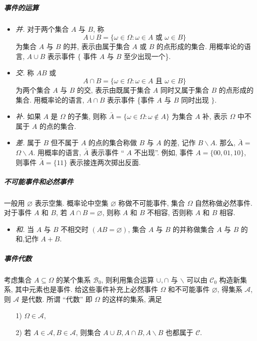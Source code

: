\subparagraph{事件的运算}
\begin{itemize}
    \item \emph {并.} 对于两个集合 $A$ 与 $B$, 称
    $$
    A \cup B=\{\omega \in \Omega: \omega \in A \text { 或 } \omega \in B\}
    $$
    为集合 $A$ 与 $B$ 的并, 表示由属于集合 $A$ 或 $B$ 的点形成的集合. 用概率论的语言, $A \cup B$ 表示事件 $\{$ 事件 $A$ 与 $B$ 至少出现一个\}.
    \item \emph {交.} 称 $A B$ 或
    $$
    A \cap B=\{\omega \in \Omega: \omega \in A \text { 且 } \omega \in B\}
    $$
    为两个集合 $A$ 与 $B$ 的交, 表示由既属于集合 $A$ 同时又属于集合 $B$ 的点形成的集合. 用概率论的语言, $A \cap B$ 表示事件 \{事件 $A$ 与 $B$ 同时出现 $\}$.
    \item \emph{补.} 如果 $A$ 是 $\Omega$ 的子集, 则称 $\bar{A}=\{\omega \in \Omega: \omega \notin A\}$ 为集合 $A$ 补, 表示 $\Omega$ 中不属于 $A$ 的点的集合.
    \item \emph{差.} 属于 $B$ 但不属于 $A$ 的点的集合称做 $B$ 与 $A$ 的差, 记作 $B \backslash A$. 那么, $\bar{A}=$ $\Omega \backslash A$. 用概率的语言, $\bar{A}$ 表示事件 `` $A$ 不出现''. 例如, 事件 $A=\{00,01,10\}$, 则事件 $\bar{A}=\{11\}$ 表示接连两次掷出反面.
\end{itemize}

\subparagraph{不可能事件和必然事件} 一般用 $\varnothing$ 表示空集. 概率论中空集 $\varnothing$ 称做不可能事件, 集合 $\Omega$ 自然称做必然事件. 
对于事件 $A$ 和 $B$, 若 $A \cap B=\varnothing$, 则称 $A$ 和 $B$ 不相容, 否则称 $A$ 和 $B$ 相容. 
\begin{itemize}
    \item \emph{和. } 当 $A$ 与 $B$ 不相交时 $(A B=\varnothing)$, 集合 $A$ 与 $B$ 的并称做集合 $A$ 与 $B$ 的和,记作 $A+B$.
\end{itemize}

\subparagraph{事件代数} 考虑集合 $A \subseteq \Omega$ 的某个集系 $\mathscr{B}_0$, 则利用集合运算 $\cup, \cap$ 与 $\backslash$ 可以由 $\mathscr{C}_0$ 构造新集系, 其中元素也是事件. 给这些事件补充上必然事件 $\Omega$ 和不可能事件 $\varnothing$, 得集系 $\mathscr{A}$, 则 $\mathcal{A}$ 是代数. 所谓 ``代数'' 即 $\Omega$ 的这样的集系, 满足
\begin{itemize}
    \item [1)] $\Omega \in \mathscr{A}$,
    \item [2)] 若 $A \in \mathscr{A}, B \in \mathscr{A}$, 则集合 $A \cup B, A \cap B, A \backslash B$ 也都属于 $\mathscr{C}$.
\end{itemize}

